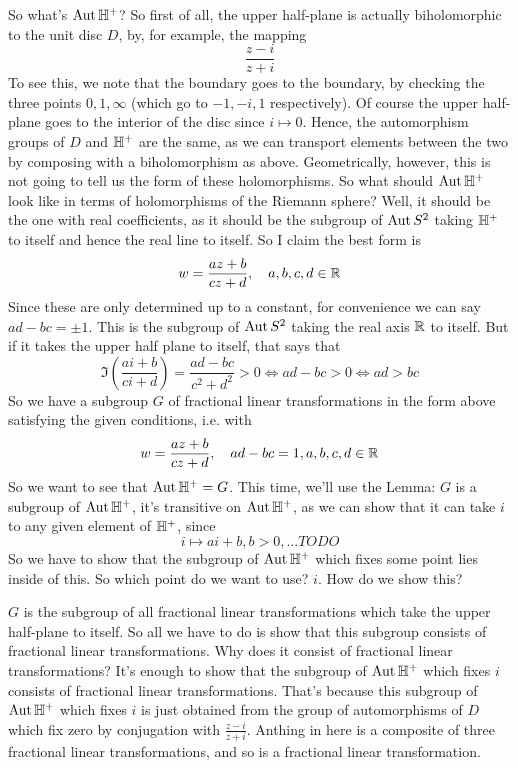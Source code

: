 \documentclass{article}
\begin{document}
So what's \(\operatorname{Aut}\mathbb{H}^+\)? So first of all, the upper half-plane is actually biholomorphic to the unit disc \(D\), by, for example, the mapping
\begin{equation}\frac{z - i}{z + i}\end{equation}
To see this, we note that the boundary goes to the boundary, by checking the three points \(0, 1, \infty\) (which go to \(-1, -i, 1\) respectively). Of course the upper half-plane goes to the interior of the disc since \(i \mapsto 0\). Hence, the automorphism groups of \(D\) and \(\mathbb{H}^+\) are the same, as we can transport elements between the two by composing with a biholomorphism as above. Geometrically, however, this is not going to tell us the form of these holomorphisms. So what should \(\operatorname{Aut}\mathbb{H}^+\) look like in terms of holomorphisms of the Riemann sphere? Well, it should be the one with real coefficients, as it should be the subgroup of \(\operatorname{Aut} S^2\) taking \(\mathbb{H}^+\) to itself and hence the real line to itself. So I claim the best form is
\begin{equation}w = \frac{az + b}{cz + d}, \quad a, b, c, d \in \mathbb{R}\end{equation}
Since these are only determined up to a constant, for convenience we can say \(ad - bc = \pm 1\). This is the subgroup of \(\operatorname{Aut} S^2\) taking the real axis \(\mathbb{R}\) to itself. But if it takes the upper half plane to itself, that says that
\begin{equation}\Im\left(\frac{ai + b}{ci + d}\right) = \frac{ad - bc}{c^2 + d^2} > 0 \iff ad - bc > 0 \iff ad > bc\end{equation}
So we have a subgroup \(G\) of fractional linear transformations in the form above satisfying the given conditions, i.e. with
\begin{equation}w = \frac{az + b}{cz + d}, \quad ad - bc = 1, a, b, c, d \in \mathbb{R}\end{equation}
So we want to see that \(\operatorname{Aut}\mathbb{H}^+ = G\). This time, we'll use the Lemma: \(G\) is a subgroup of \(\operatorname{Aut}\mathbb{H}^+\), it's transitive on \(\operatorname{Aut}\mathbb{H}^+\), as we can show that it can take \(i\) to any given element of \(\mathbb{H}^+\), since
\begin{equation}i \mapsto ai + b, b > 0, ... TODO\end{equation}
So we have to show that the subgroup of \(\operatorname{Aut}\mathbb{H}^+\) which fixes some point lies inside of this. So which point do we want to use? \(i\). How do we show this?

\(G\) is the subgroup of all fractional linear transformations which take the upper half-plane to itself. So all we have to do is show that this subgroup consists of fractional linear transformations. Why does it consist of fractional linear transformations? It's enough to show that the subgroup of \(\operatorname{Aut}\mathbb{H}^+\) which fixes \(i\) consists of fractional linear transformations. That's because this subgroup of \(\operatorname{Aut}\mathbb{H}^+\) which fixes \(i\) is just obtained from the group of automorphisms of \(D\) which fix zero by conjugation with \(\frac{z - i}{z + i}\). Anthing in here is a composite of three fractional linear transformations, and so is a fractional linear transformation.
\end{document}
